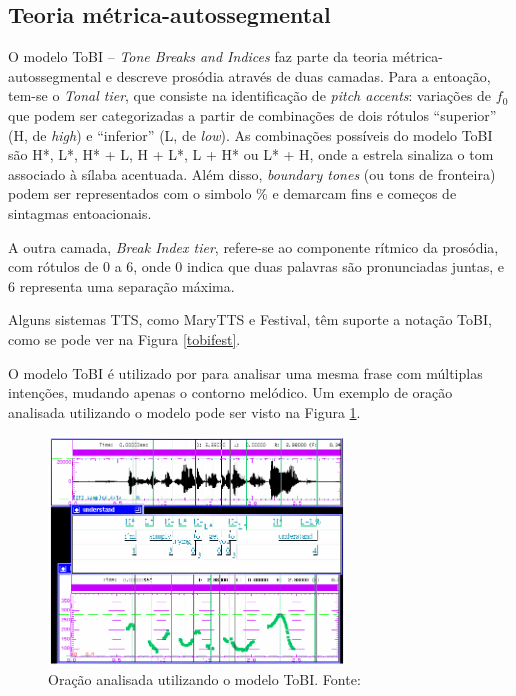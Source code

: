 \subsection{Teoria métrica-autossegmental}
O modelo ToBI -- \emph{Tone Breaks and Indices} \cite{tobi} faz parte da teoria
métrica-autossegmental e descreve prosódia através de duas camadas. Para a
entoação, tem-se o \emph{Tonal tier}, que consiste na identificação de
\emph{pitch accents}: variações de $ f_0 $ que podem ser categorizadas a partir de
combinações de dois rótulos ``superior'' (H, de \emph{high}) e ``inferior'' (L,
de \emph{low}). As combinações possíveis do modelo ToBI são H*, L*, H* + L, H +
L*, L + H* ou L* + H, onde a estrela sinaliza o tom associado à sílaba
acentuada. Além disso, \emph{boundary tones} (ou tons de fronteira) podem ser
representados com o simbolo \% e demarcam fins e começos de sintagmas
entoacionais.

A outra camada, \emph{Break Index tier}, refere-se ao componente rítmico da
prosódia, com rótulos de 0 a 6, onde 0 indica que duas palavras são
pronunciadas juntas, e 6 representa uma separação máxima.

Alguns sistemas TTS, como MaryTTS e Festival, têm suporte a notação ToBI, como se
pode ver na Figura \ref{tobifest}.

O modelo ToBI é utilizado por  para analisar uma mesma
frase com múltiplas intenções, mudando apenas o contorno melódico. Um exemplo de
oração analisada utilizando o modelo pode ser visto na Figura \ref{fig:tobiana}.

\begin{figure}
  \centering
    \includegraphics[width=0.7\textwidth]{Imagens/tobi.png}
  \caption[Oração analisada utilizando o modelo ToBI]{Oração analisada utilizando o modelo ToBI. Fonte: \cite{tobiguide}}
  \label{fig:tobiana}
\end{figure}


